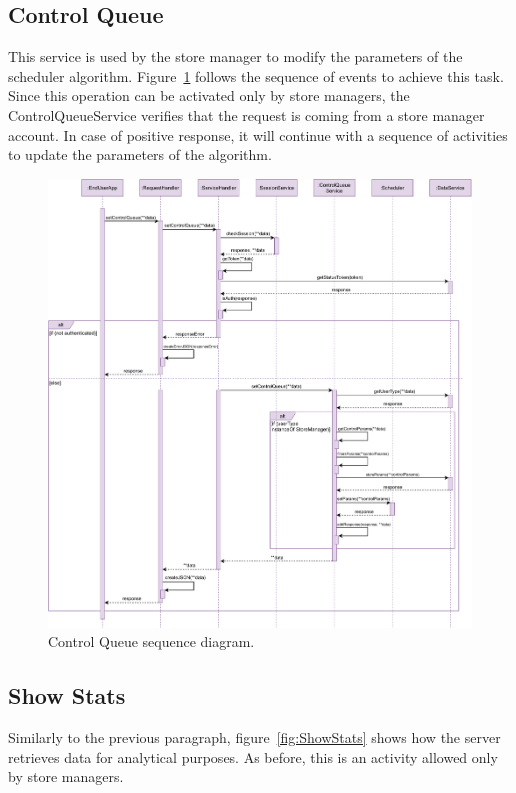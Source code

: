 \subsection{Control Queue}

This service is used by the store manager to modify the parameters of the scheduler algorithm.
Figure~\ref{fig:ControlQueue} follows the sequence of events to achieve this task. Since this operation can be activated only by store managers, the ControlQueueService verifies that the request is coming from a store manager account. In case of positive response, it will continue with a sequence of activities to update the parameters of the algorithm.

\begin{figure}[H]
	\centering
	\includegraphics[width=1.0\textwidth]{images/controlQueue_sequence_diagram.pdf}
	\caption{Control Queue sequence diagram.}\label{fig:ControlQueue}
\end{figure}

\subsection{Show Stats}

Similarly to the previous paragraph, figure~\ref{fig:ShowStats} shows how the server retrieves data for analytical purposes. As before, this is an activity allowed only by store managers.

